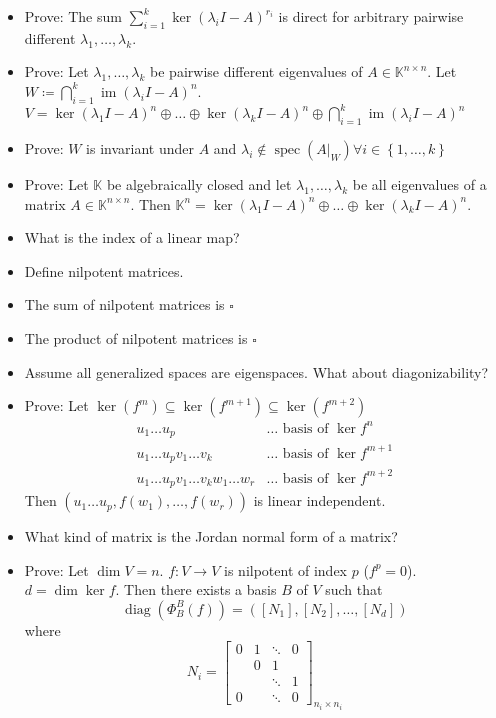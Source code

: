 \documentclass[a4paper]{article}
\newcommand{\set}[1]{\left\{#1\right\}}
\DeclareMathOperator{\im}{im}
\begin{document}
\begin{itemize}
  \item Prove: The sum $\sum_{i=1}^k \ker(\lambda_i I - A)^{r_i}$ is direct for arbitrary pairwise different $\lambda_1, \dots, \lambda_k$.
  \item Prove: Let $\lambda_1, \dots, \lambda_k$ be pairwise different eigenvalues of $A \in \mathbb K^{n\times n}$. Let $W \coloneqq \bigcap_{i=1}^k \im(\lambda_i I - A)^n$. $V = \ker(\lambda_1 I - A)^{n} \oplus \dots \oplus \ker(\lambda_k I - A)^n \oplus \bigcap_{i=1}^k \im(\lambda_i I - A)^n$
  \item Prove: $W$ is invariant under $A$ and $\lambda_i \not\in \operatorname{spec}(A|_W) \forall i \in \set{1, \dots, k}$
  \item Prove: Let $\mathbb K$ be algebraically closed and let $\lambda_1, \dots, \lambda_k$ be all eigenvalues of a matrix $A \in \mathbb K^{n\times n}$. Then $\mathbb K^{n} = \ker(\lambda_1 I - A)^n \oplus \dots \oplus \ker(\lambda_k I - A)^n$.
  \item What is the index of a linear map?
  \item Define nilpotent matrices.
  \item The sum of nilpotent matrices is $\square{}$
  \item The product of nilpotent matrices is $\square{}$
  \item Assume all generalized spaces are eigenspaces. What about diagonizability?
  \item Prove: Let $\ker(f^m) \subseteq \ker(f^{m+1}) \subseteq \ker(f^{m+2})$
    \begin{align*}
      u_1 \dots u_p & \dots \text{ basis of } \ker{f^n} \\
      u_1 \dots u_p v_1 \dots v_k & \dots \text{ basis of } \ker{f^{m+1}} \\
      u_1 \dots u_p v_1 \dots v_k w_1 \dots w_r & \dots \text{ basis of } \ker{f^{m+2}}
    \end{align*}
    Then $(u_1 \dots u_p, f(w_1), \dots, f(w_r))$ is linear independent.
  \item What kind of matrix is the Jordan normal form of a matrix?
  \item Prove: Let $\dim{V} = n$. $f: V \to V$ is nilpotent of index $p$ ($f^p = 0$). $d = \dim\ker{f}$. Then there exists a basis $B$ of $V$ such that
    \[ \operatorname{diag}\left(\Phi_B^B(f)\right) = ([N_1], [N_2], \dots, [N_d]) \]
    where
    \[
      N_i = \begin{bmatrix} 0 & 1 & \ddots & 0 \\  & 0 & 1 & \\ & & \ddots & 1 \\ 0 & & \ddots & 0 \end{bmatrix}_{n_i \times n_i}
\]
\end{itemize}
\end{document}
